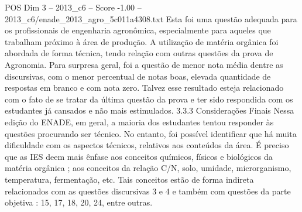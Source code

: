 \begin{textsample}{POS Dim 3 – 2013\_c6 – Score -1.00 – 2013\_c6/enade\_2013\_agro\_5c011a4308.txt}
Esta foi uma questão adequada para os profissionais de engenharia agronômica, especialmente para aqueles que trabalham próximo à área de produção.
A utilização de matéria orgânica foi abordada de forma técnica, tendo relação com outras questões da prova de Agronomia.
Para surpresa geral, foi a questão de menor nota média dentre as discursivas, com o menor percentual de notas boas, elevada quantidade de respostas em branco e com nota zero.
Talvez esse resultado esteja relacionado com o fato de se tratar da última questão da prova e ter sido respondida com os estudantes já cansados e não mais estimulados. 3.3.3 Considerações Finais Nessa edição do ENADE, em geral, a maioria dos estudantes tentou responder às questões procurando ser técnico.
No entanto, foi possível identificar que há muita dificuldade com os aspectos técnicos, relativos aos conteúdos da área.
É preciso que as IES deem mais ênfase aos conceitos químicos, físicos e biológicos da matéria orgânica ; aos conceitos da relação C/N, solo, umidade, microrganismo, temperatura, fermentação, etc.
Tais conceitos estão de forma indireta relacionados com as questões discursivas 3 e 4 e também com questões da parte objetiva : 15, 17, 18, 20, 24, entre outras.

\end{textsample}
